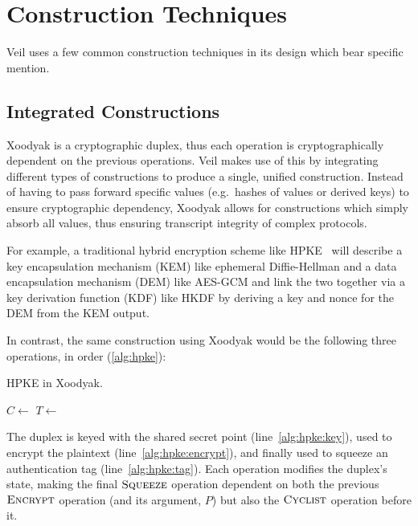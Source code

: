 \section{Construction Techniques}\label{sec:construction-techniques}

Veil uses a few common construction techniques in its design which bear specific mention.

\subsection{Integrated Constructions}\label{subsec:cons-integrated-constructions}

Xoodyak is a cryptographic duplex, thus each operation is cryptographically dependent on the previous operations.
Veil makes use of this by integrating different types of constructions to produce a single, unified construction.
Instead of having to pass forward specific values (e.g.\ hashes of values or derived keys) to ensure cryptographic
dependency, Xoodyak allows for constructions which simply absorb all values, thus ensuring transcript integrity of
complex protocols.

For example, a traditional hybrid encryption scheme like HPKE~\cite{rfc9180} will describe a key encapsulation mechanism
(KEM) like ephemeral Diffie-Hellman and a data encapsulation mechanism (DEM) like AES-GCM and link the two together via
a key derivation function (KDF) like HKDF by deriving a key and nonce for the DEM from the KEM output.

In contrast, the same construction using Xoodyak would be the following three operations, in order (\ref{alg:hpke}):

\begin{algorithm}[ht]
    \caption{HPKE in Xoodyak.}
    \begin{algorithmic}[1]
        \State {}\label{alg:hpke:key}
        \State $C \gets $ \label{alg:hpke:encrypt}
        \State $T \gets $ \label{alg:hpke:tag}
    \end{algorithmic}
    \label{alg:hpke}
\end{algorithm}

The duplex is keyed with the shared secret point (line~\ref{alg:hpke:key}), used to encrypt the plaintext
(line~\ref{alg:hpke:encrypt}), and finally used to squeeze an authentication tag (line~\ref{alg:hpke:tag}).
Each operation modifies the duplex's state, making the final $\textsc{Squeeze}$ operation dependent on both the
previous $\textsc{Encrypt}$ operation (and its argument, $P$) but also the $\textsc{Cyclist}$ operation before it.

